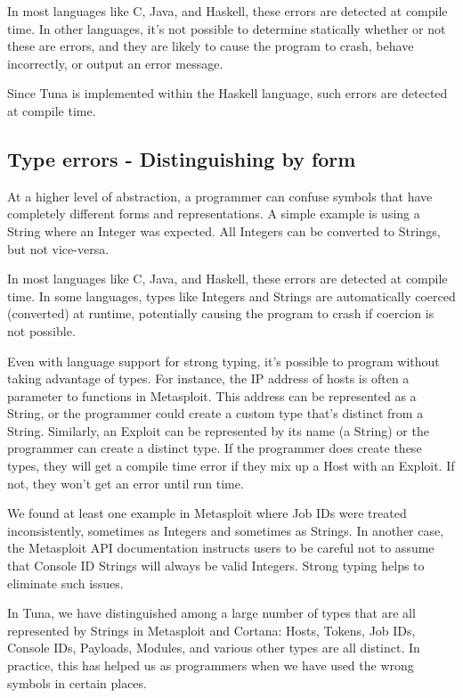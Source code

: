 \documentclass[figure,letterpaper,onefignum]{mysiam}
\begin{document}
In most languages like C, Java, and Haskell, these errors are detected at compile time. In other languages, it's not possible to determine statically whether or not these are errors, and they are likely to cause the program to crash, behave incorrectly, or output an error message.

Since Tuna is implemented within the Haskell language, such errors are detected at compile time.

\subsection{Type errors - Distinguishing by form}
At a higher level of abstraction, a programmer can confuse symbols that have completely different forms and representations. A simple example is using a String where an Integer was expected. All Integers can be converted to Strings, but not vice-versa.

In most languages like C, Java, and Haskell, these errors are detected at compile time. In some languages, types like Integers and Strings are automatically coerced (converted) at runtime, potentially causing the program to crash if coercion is not possible. 

Even with language support for strong typing, it's possible to program without taking advantage of types. For instance, the IP address of hosts is often a parameter to functions in Metasploit. This address can be represented as a String, or the programmer could create a custom type that's distinct from a String. Similarly, an Exploit can be represented by its name (a String) or the programmer can create a distinct type. If the programmer does create these types, they will get a compile time error if they mix up a Host with an Exploit. If not, they won't get an error until run time.

We found at least one example in Metasploit where Job IDs were treated inconsistently, sometimes as Integers and sometimes as Strings. In another case, the Metasploit API documentation instructs users to be careful not to assume that Console ID Strings will always be valid Integers. Strong typing helps to eliminate such issues.

In Tuna, we have distinguished among a large number of types that are all represented by Strings in Metasploit and Cortana: Hosts, Tokens, Job IDs, Console IDs, Payloads, Modules, and various other types are all distinct. In practice, this has helped us as programmers when we have used the wrong symbols in certain places.
\end{document}

